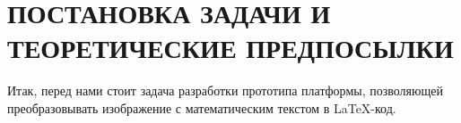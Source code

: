 \section{ПОСТАНОВКА ЗАДАЧИ И ТЕОРЕТИЧЕСКИЕ ПРЕДПОСЫЛКИ}

Итак, перед нами стоит задача разработки прототипа платформы, позволяющей преобразовывать изображение с математическим текстом в \LaTeX-код.


